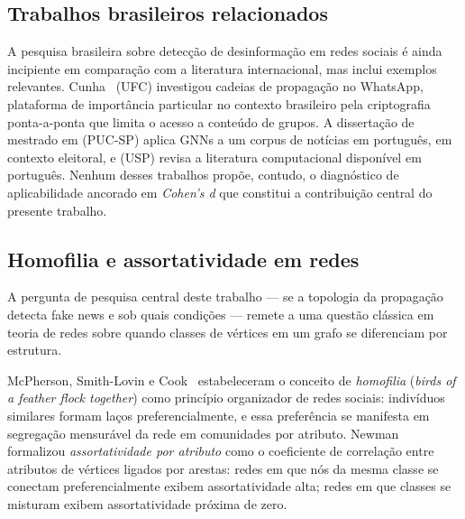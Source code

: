 \subsection{Trabalhos brasileiros relacionados}
\label{sec:trabalhos_br}

A pesquisa brasileira sobre detec\c{c}\~ao de desinforma\c{c}\~ao em
redes sociais \'e ainda incipiente em compara\c{c}\~ao com a literatura
internacional, mas inclui exemplos relevantes. Cunha~\cite{ufc_fakewhatsapp}
(UFC) investigou cadeias de propaga\c{c}\~ao no WhatsApp, plataforma de
import\^ancia particular no contexto brasileiro pela criptografia
ponta-a-ponta que limita o acesso a conte\'udo de grupos. A
disserta\c{c}\~ao de mestrado em \cite{pucsp_gnnfakenews} (PUC-SP)
aplica GNNs a um corpus de not\'icias em portugu\^es, em contexto
eleitoral, e \cite{usp_fakenews} (USP) revisa a literatura computacional
dispon\'ivel em portugu\^es. Nenhum desses trabalhos prop\~oe, contudo, o
diagn\'ostico de aplicabilidade ancorado em \emph{Cohen's d} que
constitui a contribui\c{c}\~ao central do presente trabalho.

\subsection{Homofilia e assortatividade em redes}
\label{sec:homofilia}

A pergunta de pesquisa central deste trabalho --- se a topologia da propaga\c{c}\~ao
detecta fake news e sob quais condi\c{c}\~oes --- remete a uma quest\~ao cl\'assica
em teoria de redes sobre quando classes de v\'ertices em um grafo
se diferenciam por estrutura.

McPherson, Smith-Lovin e Cook~\cite{mcpherson2001birds} estabeleceram
o conceito de \emph{homofilia} (\emph{birds of a feather flock
together}) como princ\'ipio organizador de redes sociais: indiv\'iduos
similares formam la\c{c}os preferencialmente, e essa prefer\^encia se
manifesta em segrega\c{c}\~ao mensur\'avel da rede em comunidades por
atributo. Newman~\cite{newman2003mixing} formalizou \emph{assortatividade
por atributo} como o coeficiente de correla\c{c}\~ao entre atributos
de v\'ertices ligados por arestas: redes em que n\'os da mesma
classe se conectam preferencialmente exibem assortatividade alta;
redes em que classes se misturam exibem assortatividade pr\'oxima de
zero.

